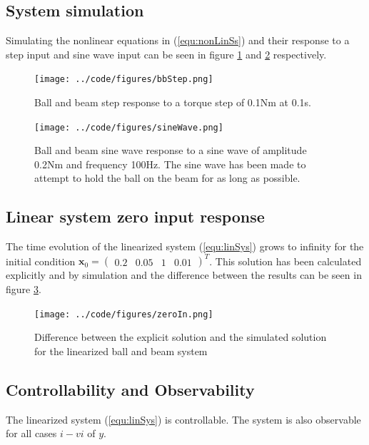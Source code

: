 \documentclass[a4paper, titlepage]{article}
\begin{document}
\subsection{System simulation}
Simulating the nonlinear equations in (\ref{equ:nonLinSs}) and their response to a step input and sine wave input can be seen in figure \ref{fig:bbStep} and \ref{fig:sineWave} respectively.

\begin{figure}[H]
\center
\texttt{[image: ../code/figures/bbStep.png]}
\caption{Ball and beam step response to a torque step of 0.1Nm at 0.1s.}
\label{fig:bbStep}
\end{figure}

\begin{figure}[H]
\center
\texttt{[image: ../code/figures/sineWave.png]}
\caption{Ball and beam sine wave response to a sine wave of amplitude 0.2Nm and frequency 100Hz. The sine wave has been made to attempt to hold the ball on the beam for as long as possible.}
\label{fig:sineWave}
\end{figure}

\subsection{Linear system zero input response}
The time evolution of the linearized system (\ref{equ:linSys}) grows to infinity for the initial condition $\textbf{x}_0 = \begin{pmatrix} 0.2 & 0.05 & 1 & 0.01 \end{pmatrix}^T$.
This solution has been calculated explicitly and by simulation and the difference between the results can be seen in figure \ref{fig:zeroIn}.

\begin{figure}[H]
\center
\texttt{[image: ../code/figures/zeroIn.png]}
\caption{Difference between the explicit solution and the simulated solution for the linearized ball and beam system}
\label{fig:zeroIn}
\end{figure}

\subsection{Controllability and Observability}
The linearized system (\ref{equ:linSys}) is controllable.
The system is also observable for all cases $i - vi$ of $y$.
\end{document}
